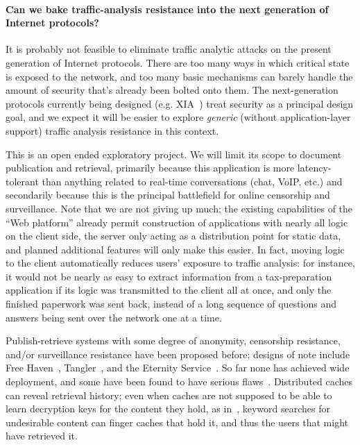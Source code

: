 \documentclass[oneside,tinymargin]{zarticle}
\begin{document}
\begin{multicols}{2}
\paragraph{Can we bake traffic-analysis resistance into the next
generation of Internet protocols?}  It is probably not feasible to
eliminate traffic analytic attacks on the present generation of
Internet protocols.  There are too many ways in which critical state
is exposed to the network, and too many basic mechanisms can barely
handle the amount of security that's already been bolted onto them.
The next-generation protocols currently being designed
(e.g. XIA~\cite{xia2013xia}) treat security as a principal design
goal, and we expect it will be easier to explore \emph{generic}
(without application-layer support) traffic analysis resistance in
this context.

This is an open ended exploratory project.  We will limit its scope to
document publication and retrieval, primarily because this application
is more latency-tolerant than anything related to real-time
conversations (chat, VoIP, etc.) and secondarily because this is the
principal battlefield for online censorship and surveillance.  Note
that we are not giving up much; the existing capabilities of the “Web
platform” already permit construction of applications with nearly all
logic on the client side, the server only acting as a distribution
point for static data, and planned additional features will only make
this easier.  In fact, moving logic to the client automatically
reduces users' exposure to traffic analysis: for instance, it would
not be nearly as easy to extract information from a tax-preparation
application if its logic was transmitted to the client all at once,
and only the finished paperwork was sent back, instead of a long
sequence of questions and answers being sent over the network one at a
time.

Publish-retrieve systems with some degree of anonymity, censorship
resistance, and/or surveillance resistance have been proposed before;
designs of note include Free Haven~\cite{dingledine2000freehaven},
Tangler~\cite{waldman2001tangler}, and the Eternity
Service~\cite{anderson1996eternity, benes2001strongeternity}. So far
none has achieved wide deployment, and some have been found to have
serious flaws~\cite{kugler2003gnunet}.  Distributed caches can reveal
retrieval history; even when caches are not supposed to be able to
learn decryption keys for the content they hold, as
in~\textcite{serjantov2002anonymizing}, keyword searches for
undesirable content can finger caches that hold it, and thus the users
that might have retrieved it.


\end{multicols}
\end{document}
